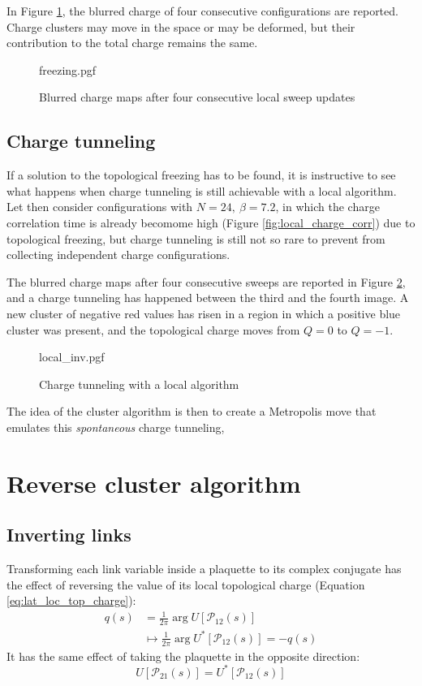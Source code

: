 In Figure \ref{fig:freezing}, the blurred charge of four consecutive configurations are reported.
Charge clusters may move in the space or may be deformed,
but their contribution to the total charge remains the same.

\begin{figure}[!htb]
    \centering
    {freezing.pgf}
    \caption{Blurred charge maps after four consecutive local sweep updates}
    \label{fig:freezing}
\end{figure}

\subsection*{Charge tunneling}
If a solution to the topological freezing has to be found,
it is instructive to see what happens when charge tunneling is still achievable with a local algorithm.
Let then consider configurations with $N=24,\ \beta=7.2$,
in which the charge correlation time is already becomome high (Figure \ref{fig:local_charge_corr}) due to topological freezing,
but charge tunneling is still not so rare to prevent from collecting independent charge configurations.

The blurred charge maps after four consecutive sweeps are reported in Figure \ref{fig:local_inv},
and a charge tunneling has happened between the third and the fourth image.
A new cluster of negative red values has risen in a region in which a positive blue cluster was present,
and the topological charge moves from $Q=0$ to $Q=-1$.

\begin{figure}[!htb]
    \centering
    {local_inv.pgf}
    \caption{Charge tunneling with a local algorithm}
    \label{fig:local_inv}
\end{figure}

The idea of the cluster algorithm is then to create a Metropolis move that emulates this \emph{spontaneous} charge tunneling,

\section{Reverse cluster algorithm}

\subsection*{Inverting links}

Transforming each link variable inside a plaquette to its complex conjugate
has the effect of reversing the value of its local topological charge (Equation \eqref{eq:lat_loc_top_charge}):
\[\begin{aligned}
    q(s) &= \frac{1}{2\pi}\arg U[\mathcal P_{12}(s)] \\
         &\mapsto \frac{1}{2\pi}\arg U^*[\mathcal P_{12}(s)] = -q(s)
\end{aligned}\]
It has the same effect of taking the plaquette in the opposite direction:
\[
    U[\mathcal P_{21}(s)] = U^*[\mathcal P_{12}(s)]
\]

